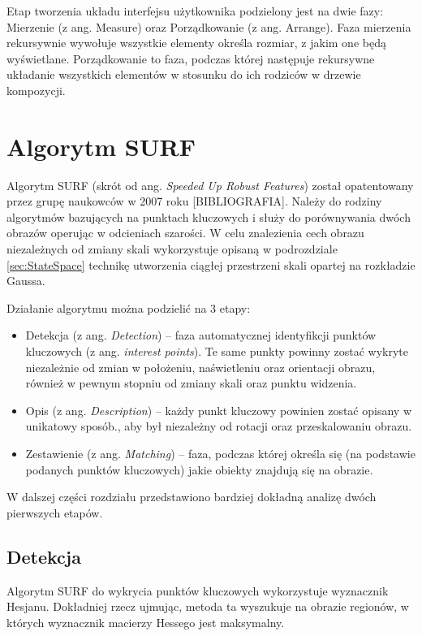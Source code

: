 Etap tworzenia układu interfejsu użytkownika podzielony jest na dwie fazy: Mierzenie (z ang. Measure) oraz Porządkowanie (z ang. Arrange). Faza mierzenia rekursywnie wywołuje wszystkie elementy określa rozmiar, z jakim one będą wyświetlane. Porządkowanie to faza, podczas której następuje rekursywne układanie wszystkich elementów w stosunku do ich rodziców w drzewie kompozycji. 


\section{Algorytm SURF}
Algorytm SURF (skrót od ang. \textit{Speeded Up Robust Features}) został opatentowany przez grupę naukowców w 2007 roku [BIBLIOGRAFIA]. Należy do rodziny algorytmów bazujących na punktach kluczowych i służy do porównywania dwóch obrazów operując w odcieniach szarości. W celu znalezienia cech obrazu niezależnych od zmiany skali wykorzystuje opisaną w podrozdziale \ref{sec:StateSpace} technikę utworzenia ciągłej przestrzeni skali opartej na rozkładzie Gaussa. 

Działanie algorytmu można podzielić na 3 etapy:
\begin{itemize}
	\item Detekcja (z ang. \textit{Detection}) – faza automatycznej identyfikcji punktów kluczowych (z ang. \textit{interest points}). Te same punkty powinny zostać wykryte niezależnie od zmian w położeniu, naświetleniu oraz orientacji obrazu, również w pewnym stopniu od zmiany skali oraz punktu widzenia. 
	\item Opis (z ang. \textit{Description}) – każdy punkt kluczowy powinien zostać opisany w unikatowy sposób., aby był niezależny od rotacji oraz przeskalowaniu obrazu.
	\item Zestawienie (z ang. \textit{Matching}) – faza, podczas której określa się (na podstawie podanych punktów kluczowych) jakie obiekty znajdują się na obrazie. 
\end{itemize}

W dalszej części rozdziału przedstawiono bardziej dokładną analizę dwóch pierwszych etapów.

\subsection{Detekcja}
Algorytm SURF do wykrycia punktów kluczowych wykorzystuje wyznacznik Hesjanu. Dokładniej rzecz ujmując, metoda ta wyszukuje na obrazie regionów, w których wyznacznik macierzy Hessego jest maksymalny. 






